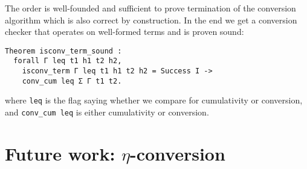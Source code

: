 The order is well-founded and sufficient to prove termination of the conversion
algorithm which is also correct by construction.
In the end we get a conversion checker that operates on well-formed terms and
is proven sound:
\begin{verbatim}
Theorem isconv_term_sound :
  forall Γ leq t1 h1 t2 h2,
    isconv_term Γ leq t1 h1 t2 h2 = Success I ->
    conv_cum leq Σ Γ t1 t2.
\end{verbatim}
where \texttt{leq} is the flag saying whether we compare for
cumulativity or conversion, and \texttt{conv_cum leq} is either
cumulativity or conversion.

\section{Future work: \(\eta\)-conversion}

